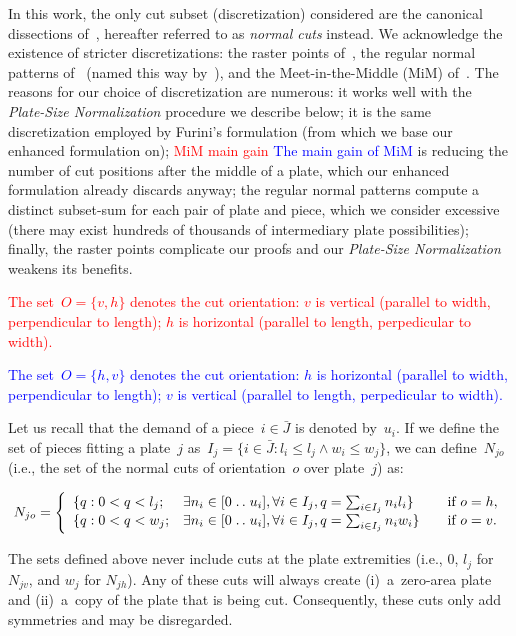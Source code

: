 \documentclass[ppgc,tese,english,formais,babel]{iiufrgs}
\newif\iffinalversion
\newcommand{\newtext}[1]{\iffinalversion%
#1%
\else%
\textcolor{blue}{#1}%
\fi%
}
\newcommand{\oldtext}[1]{\iffinalversion%
\else%
\textcolor{red}{#1}%
\fi%
}
\newcommand{\isep}{\mathrel{{.}\,{.}}\nobreak} %
\begin{document}
In this work, the only cut subset (discretization) considered are the canonical dissections of~\citet{herz:1972}, hereafter referred to as \emph{normal cuts} instead.
We acknowledge the existence of stricter discretizations: the raster points of~\citet{terno:1987,guntram:1966}, the regular normal patterns of~\citet{boschetti:2002} (named this way by~\citet{cote:2018}), and the Meet-in-the-Middle (MiM) of~\citet{cote:2018}.
The reasons for our choice of discretization are numerous:
it works well with the \emph{Plate-Size Normalization} procedure we describe below;
it is the same discretization employed by Furini's formulation (from which we base our enhanced formulation on);
\oldtext{MiM main gain}\newtext{The main gain of MiM} is reducing the number of cut positions after the middle of a plate, which our enhanced formulation already discards anyway;
the regular normal patterns compute a distinct subset-sum for each pair of plate and piece, which we consider excessive (there may exist hundreds of thousands of intermediary plate possibilities);
finally, the raster points complicate our proofs and our \emph{Plate-Size Normalization} weakens its benefits.

\oldtext{The set~\(O = \{v, h\}\) denotes the cut orientation: \(v\) is vertical (parallel to width, perpendicular to length); \(h\) is horizontal (parallel to length, perpedicular to width).}
\newtext{The set~\(O = \{h, v\}\) denotes the cut orientation: \(h\) is horizontal (parallel to width, perpendicular to length); \(v\) is vertical (parallel to length, perpedicular to width).}
Let us recall that the demand of a piece~\(i \in \bar{J}\) is denoted by~\(u_i\).
If we define the set of pieces fitting a plate~\(j\) as~\(I_j = \{i \in \bar{J} : l_i \leq l_j \land w_i \leq w_j \}\), we can define~\(N_{jo}\) (i.e., the set of the normal cuts of orientation~\(o\) over plate~\(j\)) as:

{\iffinalversion\else\color{blue}\fi
\begin{equation}
N_{jo}= \left\{
\begin{array}{lllr}
  \{q: 0 < q < l_j; & \exists n_i \in [0 \isep u_i], \forall i \in I_j, q = \sum_{i\in I_j} n_i l_i \} & \quad \text{if } o = h,\\
  \{q: 0 < q < w_j; & \exists n_i \in [0 \isep u_i], \forall i \in I_j, q = \sum_{i\in I_j} n_i w_i \} & \quad \text{if } o = v.
\end{array}\right.
\end{equation}
}

The sets defined above never include cuts at the plate extremities (i.e., \(0\), \(l_j\) for \(N_{jv}\), and \(w_j\) for \(N_{jh}\)).
Any of these cuts will always create (i)~a~zero-area plate and (ii)~a~copy of the plate that is being cut.
Consequently, these cuts only add symmetries and may be disregarded.
\end{document}
